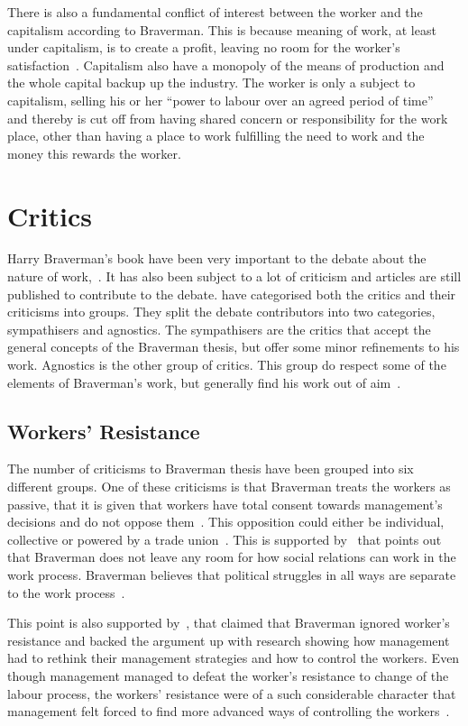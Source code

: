 \documentclass[a4paper,12pt,titlepage]{article}
\begin{document}
  There is also a fundamental conflict of interest between the worker
  and the capitalism according to Braverman. This is because meaning
  of work, at least under capitalism, is to create a profit, leaving
  no room for the worker's satisfaction~\cite[13]{sw}. Capitalism
  also have a monopoly of the means of production and the whole
  capital backup up the industry. The worker is only a subject
  to capitalism, selling his or her 
  ``power to labour over an agreed period of time''~\cite[54]{hb}
  and thereby is cut off from having shared concern or responsibility
  for the work place, other than having a place to work fulfilling
  the need to work and the money this rewards the worker.

  \section{Critics}
  Harry Braverman's book have been very important to the debate
  about the nature of work,~\cite{sw}. It has also been subject to
  a lot of criticism and articles are still published to contribute
  to the debate. \cite{mnpb} have categorised both the critics and their
  criticisms into groups. They split the debate contributors into two
  categories, sympathisers and agnostics. The sympathisers are the critics
  that accept the general concepts of the Braverman thesis, but offer some
  minor refinements to his work. Agnostics is the other group of critics. This
  group do respect some of the elements of Braverman's work, but generally
  find his work out of aim~\cite[153]{mnpb}.

  \subsection{Workers' Resistance}
  The number of criticisms to Braverman thesis have been grouped into
  six different groups. One of these criticisms is that Braverman
  treats the workers as passive,
  that it is given that workers have total consent towards management's decisions
  and do not oppose them~\cite[12]{sw}. This opposition could either be individual,
  collective or powered by a trade union~\cite[435]{ahdb}.
  This is supported by~\cite{rp} that
  points out that Braverman does not leave any room for how social relations
  can work in the work process. Braverman believes that political struggles
  in all ways are separate to the work process~\cite[43]{rp}. 

  This point is also supported by~\cite{re}, that claimed that Braverman
  ignored worker's resistance and backed the argument up with research
  showing how management had to rethink their management
  strategies and how to control the workers. Even
  though management managed to defeat the worker's resistance to change of the labour
  process, the workers' resistance were of a such considerable character that
  management felt forced to find more advanced ways of
  controlling the workers~\cite[48-71]{re}.
\end{document}
